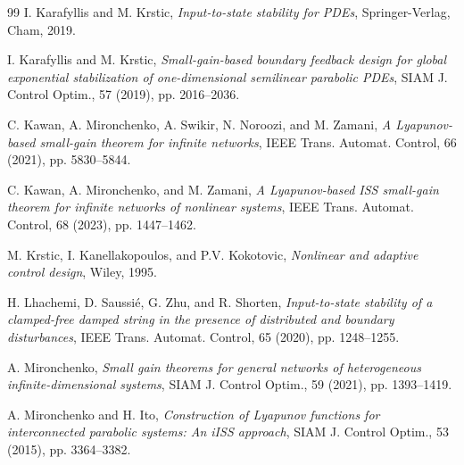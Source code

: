 \documentclass[onecolumn]{autart}
\numberwithin{equation}{section}
\begin{document}
\begin{thebibliography}{99}
		I. Karafyllis and M. Krstic, \emph{Input-to-state stability for PDEs}, Springer-Verlag, Cham, 2019.
		
		I. Karafyllis and M. Krstic, \emph{Small-gain-based boundary feedback design for global exponential stabilization of one-dimensional semilinear parabolic PDEs}, SIAM J. Control Optim., 57 (2019), pp. 2016--2036.
		
		C. Kawan, A. Mironchenko, A. Swikir, N. Noroozi, and M. Zamani, \emph{A Lyapunov-based small-gain theorem for infinite networks}, IEEE Trans. Automat. Control, 66 (2021), pp. 5830--5844.
		
		C. Kawan, A. Mironchenko, and M. Zamani, \emph{A Lyapunov-based ISS small-gain theorem for infinite networks of nonlinear systems}, IEEE Trans. Automat. Control, 68 (2023), pp. 1447--1462.
		
		M. Krstic,  I. Kanellakopoulos, and P.V. Kokotovic, \emph{Nonlinear and adaptive control design}, Wiley, 1995.
		
		
		
		H. Lhachemi, D. Saussi\'{e}, G. Zhu, and R. Shorten, \emph{Input-to-state stability of a clamped-free damped string in the presence of distributed and boundary disturbances}, IEEE Trans. Automat. Control, 65 (2020), pp. 1248--1255.
		
		

		A. Mironchenko, \emph{Small gain theorems for general networks of heterogeneous infinite-dimensional systems}, SIAM J. Control Optim., 59 (2021), pp. 1393--1419.
		
		A. Mironchenko and H. Ito, \emph{Construction of Lyapunov functions for interconnected parabolic systems: An iISS approach}, SIAM J. Control Optim., 53 (2015), pp. 3364--3382.
		

\end{thebibliography}
\end{document}
